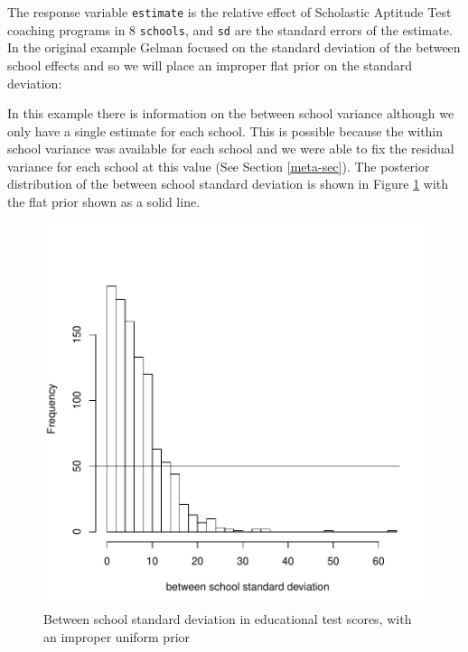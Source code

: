 \documentclass{article}
\begin{document}
The response variable \texttt{estimate} is the relative effect of Scholastic Aptitude Test coaching programs in 8 \texttt{schools}, and \texttt{sd} are the standard errors of the estimate. In the original example Gelman focused on the standard deviation of the between school effects and so we will place an improper flat prior on the standard deviation:  

\begin{Schunk}
\end{Schunk}

In this example there is information on the between school variance although we only have a single estimate for each school. This is possible because the within school variance was available for each school and we were able to fix the residual variance for each school at this value (See Section \ref{meta-sec}). The posterior distribution of the between school standard deviation is shown in Figure \ref{school1-fig} with the flat prior shown as a solid line.\\ 


\begin{figure}[!h]
\begin{center}
\includegraphics{Lecture8-012}
\end{center}
\caption{Between school standard deviation in educational test scores, with an improper uniform prior}
\label{school1-fig}
\end{figure}
\end{document}
